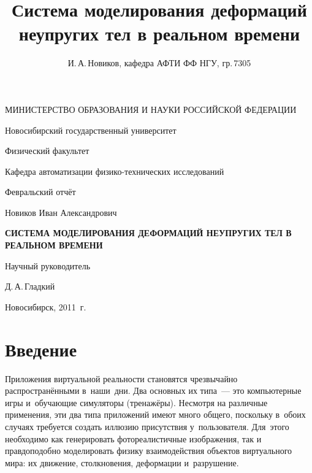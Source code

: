 \documentclass[a4paper, 14pt, titlepage]{extarticle}
\author{И.\,А.\,Новиков, кафедра АФТИ ФФ НГУ, гр.\,7305}
\title{Система моделирования деформаций неупругих тел в реальном времени}
\begin{document}

  \thispagestyle{empty} 
  \begin {center} 
  МИНИСТЕРСТВО ОБРАЗОВАНИЯ И НАУКИ РОССИЙСКОЙ ФЕДЕРАЦИИ 

  \vspace{0.3cm} 

  Новосибирский государственный университет 

  \vspace{0.3cm} 

  Физический факультет 

  Кафедра автоматизации физико-технических исследований

  \vspace {5cm} 

  Февральский отчёт 

  \vspace {1cm} 

  Новиков Иван Александрович

  \vspace {0.5cm} 

  \textbf{СИСТЕМА МОДЕЛИРОВАНИЯ ДЕФОРМАЦИЙ НЕУПРУГИХ ТЕЛ В РЕАЛЬНОМ ВРЕМЕНИ} 

  \vspace {2cm} 

  \begin{flushright} 

    Научный руководитель 

    Д.\,А.\,Гладкий

  \end{flushright}

  \vspace {5cm} 

  Новосибирск, 2011~г.
  \end {center} 


  \tableofcontents
  \newpage

  \section{Введение}

    Приложения виртуальной реальности становятся чрезвычайно рас\-прос\-тра\-нён\-ны\-ми в~наши~дни.  Два
    основных их типа~--- это компьютерные игры и~обучающие симуляторы (тренажёры). Несмотря на
    различные применения, эти два типа приложений имеют много общего, поскольку в~обоих случаях
    требуется создать иллюзию присутствия у~пользователя. Для~этого необходимо как генерировать
    фотореалистичные изображения, так и правдоподобно моделировать физику взаимодействия объектов
    виртуального мира: их движение, столкновения, деформации и~разрушение.
\end{document}
